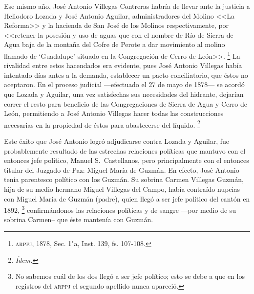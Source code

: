 \documentclass[14pt,twoside,final]{extbook} %
\let\oldfootnote\footnote
\renewcommand\footnote[1]{%
\oldfootnote{\hspace{1mm}#1}}
\begin{document}
Ese mismo año, José Antonio Villegas Contreras habría de llevar ante la justicia a Heliodoro Lozada y José Antonio Aguilar, administradores del Molino <<La Reforma>> y la hacienda de San José de los Molinos respectivamente, por <<retener la posesión y uso de aguas que con el nombre de Río de Sierra de Agua baja de la montaña del Cofre de Perote a dar movimiento al molino llamado de  `Guadalupe' situado en la Congregación de Cerro de León>>.\footnote{\textsc{arppj}, 1878, Sec. 1"a, Inst. 139, fs. 107-108.} La rivalidad entre estos hacendados era evidente, pues José Antonio Villegas había intentado días antes a la demanda, establecer un pacto conciliatorio, que éstos no aceptaron. En el proceso judicial ---efectuado el 27 de mayo de 1878--- se acordó que Lozada y Aguilar, una vez satisfechas sus necesidades del hidrante, dejarían correr el resto para beneficio de las Congregaciones de Sierra de Agua y Cerro de León, permitiendo a José Antonio Villegas hacer todas las construcciones necesarias en la propiedad de éstos para abastecerse del líquido.\footnote{\em Ídem.}

Este éxito que José Antonio logró adjudicarse contra Lozada y Aguilar, fue probablemente resultado de las estrechas relaciones políticas que mantuvo con el entonces jefe político, Manuel S.~Castellanos, pero principalmente con el entonces titular del Juzgado de Paz: Miguel María de Guzmán. En efecto, José Antonio tenía parentesco político con los Guzmán. Su sobrina Carmen Villegas Guzmán, hija de su
medio hermano Miguel Villegas del Campo, había contraído nupcias con Miguel María de Guzmán (padre), quien llegó a ser jefe político del cantón en 1892,\footnote{No sabemos cuál de los dos llegó a ser jefe político; esto se debe a que en los registros del \textsc{arppj} el segundo apellido nunca apareció.} confirmándonos las relaciones políticas y de sangre ---por medio de su sobrina Carmen-- que éste mantenía con Guzmán.
\end{document}

